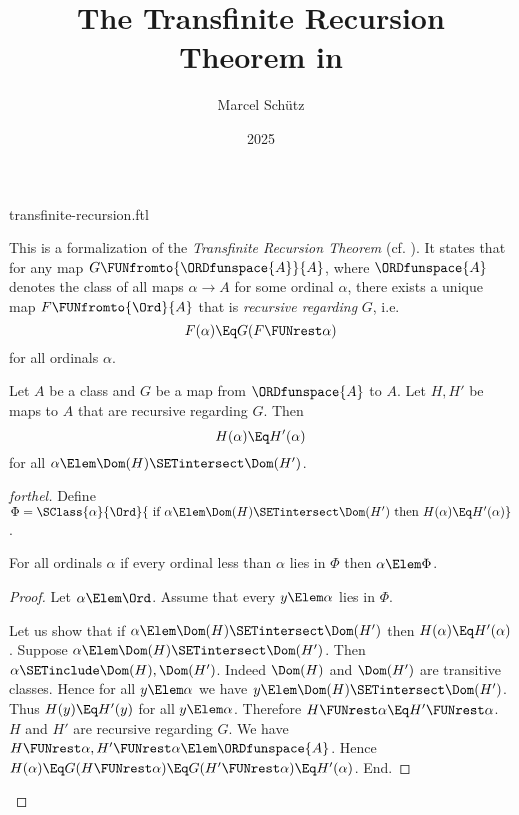 \documentclass{stex}
\title{The Transfinite Recursion Theorem in \Naproche}
\author{Marcel Schütz}
\date{2025}
\begin{document}
\begin{smodule}{transfinite-recursion.ftl}
\maketitle


\noindent This is a formalization of the \emph{Transfinite Recursion Theorem}
(cf. \cite{Koepke2018}).
It states that for any map $G \FUNfromto{\ORDfunspace{A}}{A}$, where
$\ORDfunspace{A}$ denotes the class of all maps $\alpha \to A$ for some
ordinal $\alpha$, there exists a unique map $F \FUNfromto{\Ord}{A}$ that is
\emph{recursive regarding} $G$, i.e. \[F(\alpha) \Eq G(F \FUNrest \alpha)\] for
all ordinals $\alpha$.

\begin{lemma}[forthel,title=Coincidence Lemma,id=transfinite_recursion_coincidence]
  Let $A$ be a class and $G$ be a map from $\ORDfunspace{A}$ to $A$.
  Let $H, H'$ be maps to $A$ that are recursive regarding $G$.
  Then \[ H(\alpha) \Eq H'(\alpha) \] for all $\alpha \Elem \Dom(H) \SETintersect \Dom(H')$.
\end{lemma}
\begin{proof}[forthel]
  Define $\Phi = \SClass{\alpha}{\Ord}{\text{ if }
  \alpha \Elem \Dom(H) \SETintersect \Dom(H')\text{ then }H(\alpha) \Eq H'(\alpha)}$.

  For all ordinals $\alpha$ if every ordinal less than $\alpha$ lies in $\Phi$ then $\alpha \Elem \Phi$.
  \begin{proof}
    Let $\alpha \Elem \Ord$.
    Assume that every $y \Elem \alpha$ lies in $\Phi$.

    Let us show that if $\alpha \Elem \Dom(H) \SETintersect \Dom(H')$ then
    $H(\alpha) \Eq H'(\alpha)$.
      Suppose $\alpha \Elem \Dom(H) \SETintersect \Dom(H')$.
      Then $\alpha \SETinclude \Dom(H), \Dom(H')$.
      Indeed $\Dom(H)$ and $\Dom(H')$ are transitive classes.
      Hence for all $y \Elem \alpha$ we have $y \Elem \Dom(H) \SETintersect \Dom(H')$.
      Thus $H(y) \Eq H'(y)$ for all $y \Elem \alpha$.
      Therefore $H \FUNrest \alpha \Eq H' \FUNrest \alpha$.
      $H$ and $H'$ are recursive regarding $G$.
      We have $H \FUNrest \alpha, H' \FUNrest \alpha \Elem \ORDfunspace{A}$.
      Hence $H(\alpha)
        \Eq G(H \FUNrest \alpha)
        \Eq G(H' \FUNrest \alpha)
        \Eq H'(\alpha)$.
    End.


\end{proof}
\end{proof}
\end{smodule}
\end{document}
